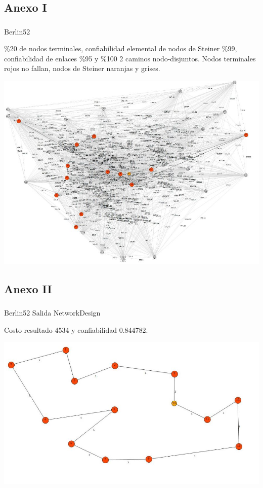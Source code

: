\subsection{Anexo I}
\begin{frame}\frametitle{}
\begin{block}{Berlin52}
\begin{scriptsize}
\%20 de nodos terminales, confiabilidad elemental de nodos de Steiner \%99, confiabilidad de enlaces \%95 y \%100 2 caminos nodo-disjuntos.  Nodos terminales rojos no fallan, nodos de Steiner naranjas y grises.
\end{scriptsize}
\begin{center}
   \includegraphics[scale=0.35]{figuras/3}
\end{center}
\end{block}
\end{frame}

\subsection{Anexo II}
\begin{frame}\frametitle{}
\begin{block}{Berlin52 Salida NetworkDesign}
\begin{scriptsize}
Costo resultado 4534 y confiabilidad 0.844782.
\end{scriptsize}
\begin{center}
   \includegraphics[scale=0.35]{figuras/4}
\end{center}
\end{block}
\end{frame}